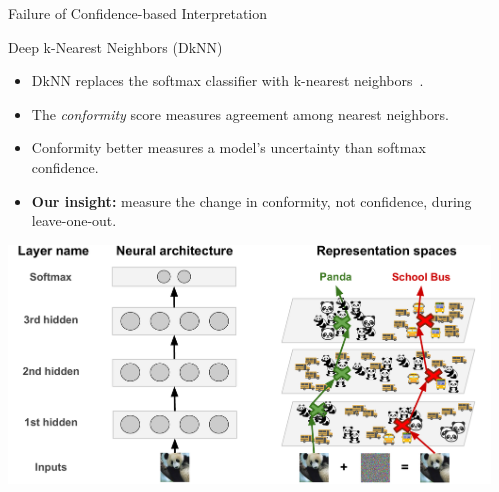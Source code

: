 \documentclass[final]{beamer} %
\begin{document}
\begin{frame}
\begin{columns}
\begin{column}{.5\linewidth}
\begin{block}{Failure of Confidence-based Interpretation}
\begin{center}
\end{center}
\vspace{0.3cm}
\end{block}

\begin{block}{Deep k-Nearest Neighbors (DkNN)}
\vspace{0.3cm}
\begin{itemize}
\item DkNN replaces the softmax classifier with k-nearest neighbors~\citep{papernot2018dknn}.
\item The \textit{conformity} score measures agreement among nearest neighbors.
\item Conformity better measures a model's uncertainty than softmax confidence.
\item \textbf{Our insight:} measure the change in conformity, not confidence, during leave-one-out.
\end{itemize}
\vspace{0.8cm}
\begin{center}
\includegraphics{figures/dknn-intuition.pdf}
\end{center}
\vspace{0.3cm}
\end{block}

\end{column} %
\begin{column}{.5\linewidth}


\end{column}
\end{columns}
\end{frame}
\end{document}
